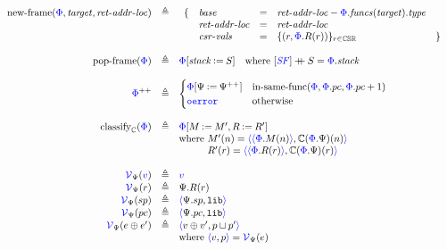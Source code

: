 \begin{center}
  \[\begin{array}{rcl}
    \oname{new-frame}(\oc{\Phi}, \mathit{target}, \mathit{ret\mbox{-}addr\mbox{-}loc}) & \triangleq &
      \begin{array}[t]{lllll}
        \{
        & \mathit{base} & = & \mathit{ret\mbox{-}addr\mbox{-}loc} - \oc{\Phi}.\mathit{funcs}(\mathit{target}).\mathit{type} \\
        & \mathit{ret\mbox{-}addr\mbox{-}loc} & = & \mathit{ret\mbox{-}addr\mbox{-}loc} \\
        & \mathit{csr\mbox{-}vals} & = & \{(r, \oc{\Phi}.R(r))\}_{r \in \mathbb{CSR}} & \}
      \end{array} \\
    \\
    \oname{pop-frame}(\oc{\Phi}) & \triangleq & \oc{\Phi}[\mathit{stack} \assign S] \quad \text{where } [\oc{\SF}] \concat S = \oc{\Phi}.\mathit{stack} \\
    \\
    \pcinc{\oc{\Phi}} & \triangleq &
      \begin{cases}
        \oc{\Phi}[\Psi \assign \pcinc{\Psi}] & \oname{in-same-func}(\oc{\Phi}, \oc{\Phi}.pc, \oc{\Phi}.pc + 1) \\
        \oerror & \text{otherwise}
      \end{cases} \\
      \\
      \oname{classify}_{\mathbb{C}}(\oc{\Phi}) & \triangleq &
      \oc{\Phi}[M \assign M', R \assign R'] \\
      & & \text{where } M'(n) = \val{\natval{\oc{\Phi}.M(n)}}{\mathbb{C}(\oc{\Phi}.\Psi)(n)} \\
      & & \phantom{\text{where }} R'(r) = \val{\natval{\oc{\Phi}.R(r)}}{\mathbb{C}(\oc{\Phi}.\Psi)(r)} \\
      \\
      \oimmval{\Psi}{\oc{v}} & \triangleq & \oc{v} \\
      \oimmval{\Psi}{r} & \triangleq & \Psi.R(r) \\
      \oimmval{\Psi}{sp} & \triangleq & \val{\Psi.sp}{\untrusted} \\
      \oimmval{\Psi}{pc} & \triangleq & \val{\Psi.pc}{\untrusted} \\
      \oimmval{\Psi}{e \oplus e'} & \triangleq & \val{v \oplus v'}{p \sqcup p'} \\
      & & \text{where } \val{v}{p} = \oimmval{\Psi}{e} \\

\end{array}\]
\end{center}
